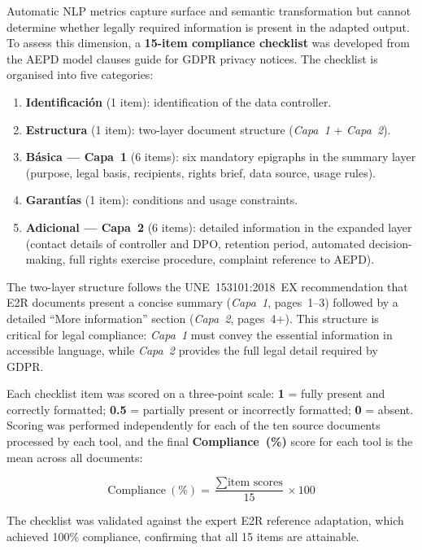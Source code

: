\documentclass[12pt, a4paper]{article}
\begin{document}
Automatic NLP metrics capture surface and semantic transformation but cannot determine
whether legally required information is present in the adapted output. To assess this
dimension, a \textbf{15-item compliance checklist} was developed from the AEPD model
clauses guide for GDPR privacy notices. The checklist is organised into five categories:

\begin{enumerate}
  \item \textbf{Identificación} (1 item): identification of the data controller.
  \item \textbf{Estructura} (1 item): two-layer document structure
    (\textit{Capa~1} + \textit{Capa~2}).
  \item \textbf{Básica --- Capa~1} (6 items): six mandatory epigraphs in the summary
    layer (purpose, legal basis, recipients, rights brief, data source, usage rules).
  \item \textbf{Garantías} (1 item): conditions and usage constraints.
  \item \textbf{Adicional --- Capa~2} (6 items): detailed information in the expanded
    layer (contact details of controller and DPO, retention period, automated
    decision-making, full rights exercise procedure, complaint reference to AEPD).
\end{enumerate}

The two-layer structure follows the UNE~153101:2018~EX recommendation that E2R documents
present a concise summary (\textit{Capa~1}, pages~1--3) followed by a detailed ``More
information'' section (\textit{Capa~2}, pages~4+). This structure is critical for legal
compliance: \textit{Capa~1} must convey the essential information in accessible language,
while \textit{Capa~2} provides the full legal detail required by GDPR.

Each checklist item was scored on a three-point scale: \textbf{1} = fully present and
correctly formatted; \textbf{0.5} = partially present or incorrectly formatted;
\textbf{0} = absent. Scoring was performed independently for each of the ten source
documents processed by each tool, and the final \textbf{Compliance~(\%)} score for each
tool is the mean across all documents:

\begin{equation}
  \text{Compliance}~(\%) = \frac{\sum \text{item scores}}{15} \times 100
  \label{eq:compliance}
\end{equation}

The checklist was validated against the expert E2R reference adaptation, which achieved
100\% compliance, confirming that all 15 items are attainable.
\end{document}
